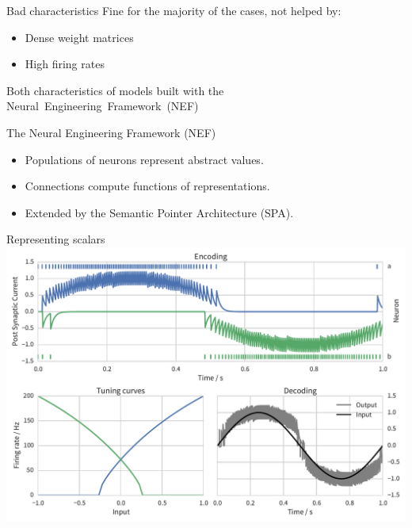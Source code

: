 \documentclass[t]{beamer}
\begin{document}
  \begin{frame}{Bad characteristics}
    Fine for the majority of the cases, not helped by:
    \begin{itemize}
      \item Dense weight matrices
      \item High firing rates
    \end{itemize}
    \pause
    Both characteristics of models built with the Neural~Engineering~Framework~(NEF)
  \end{frame}

  \begin{frame}{The Neural Engineering Framework (NEF)}
    \begin{itemize}
      \item Populations of neurons represent abstract values.
      \item Connections compute functions of representations.
      \item Extended by the Semantic Pointer Architecture (SPA).
    \end{itemize}
  \end{frame}

  \begin{frame}[plain]{Representing scalars}
    \vfill
    \includegraphics[width=\textwidth]{encoding_decoding}
    \vfill
  \end{frame}
\end{document}
